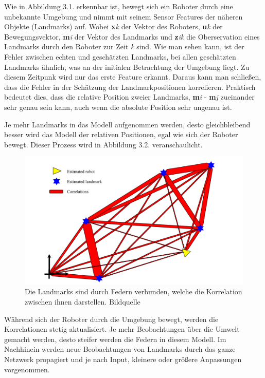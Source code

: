 Wie in Abbildung 3.1. erkennbar ist, bewegt sich ein Roboter durch eine unbekannte Umgebung und nimmt mit seinem Sensor Features der näheren Objekte (Landmarks) auf. Wobei \large\textbf{x}\normalsize\textit{k} der Vektor des Roboters,  \large\textbf{u}\normalsize\textit{k} der Bewegungsvektor, \large\textbf{m}\normalsize\textit{i} der Vektor des Landmarks und \large\textbf{z}\normalsize\textit{ik} die Oberservation eines Landmarks durch den Roboter zur Zeit \large\textit{k }\normalsize sind. Wie man sehen kann, ist der Fehler zwischen echten und geschätzten Landmarks, bei allen geschätzten Landmarks ähnlich, was an der initialen Betrachtung der Umgebung liegt. Zu diesem Zeitpunk wird nur das erste Feature erkannt. Daraus kann man schließen, dass die Fehler in der Schätzung der Landmarkpositionen korrelieren. Praktisch bedeutet dies, dass die relative Position zweier Landmarks, \large\textbf{m}\normalsize\textit{i} - \large\textbf{m}\normalsize\textit{j} zueinander sehr genau sein kann, auch wenn die absolute Position sehr ungenau ist. 

Je mehr Landmarks in das Modell aufgenommen werden, desto gleichbleibend besser wird das Modell der relativen Positionen, egal wie sich der Roboter bewegt. Dieser Prozess wird in Abbildung 3.2. veranschaulicht.

\begin{figure}[H]
	\centering
	\includegraphics[scale=0.55]{slam_springs.png}
	\caption{Die Landmarks sind durch Federn verbunden, welche die Korrelation zwischen ihnen darstellen.  Bildquelle \cite{slam}}
\end{figure}  

Während sich der Roboter durch die Umgebung bewegt, werden die Korrelationen stetig aktualisiert. Je mehr Beobachtungen über die Umwelt gemacht werden, desto steifer werden die Federn in diesem Modell. Im Nachhinein werden neue Beobachtungen von Landmarks durch das ganze Netzwerk propagiert und je nach Input, kleinere oder größere Anpassungen vorgenommen.

